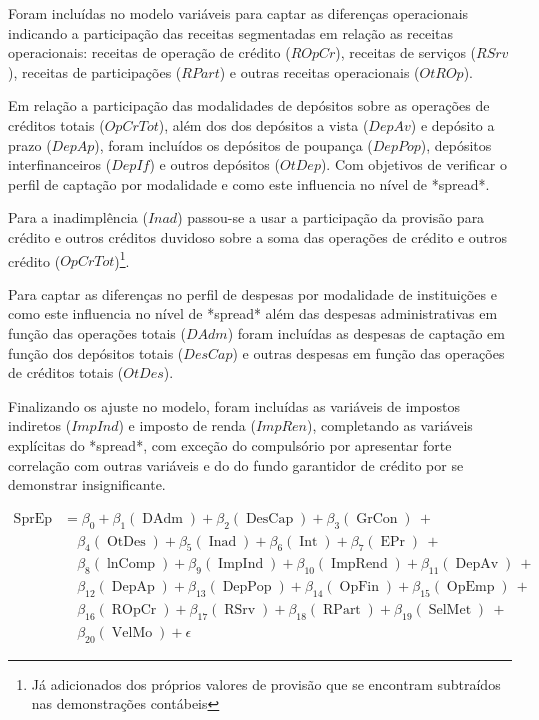 \documentclass[
  12pt,
  12pt,
  openright,
  oneside,
  a4paper,
  chapter=TITLE,
  section=TITLE,
  subsection=TITLE,
  subsubsection=TITLE,
  english,
  portugues,
  sumario=tradicional]{abntex2}
\begin{document}
\begin{apendicesenv}
Foram incluídas no modelo variáveis  para captar as diferenças operacionais indicando a participação das receitas segmentadas em relação as receitas operacionais: receitas de operação de crédito ($ROpCr$), receitas de serviços ($RSrv$), receitas de participações ($RPart$) e outras receitas operacionais ($OtROp$).

Em relação a participação das modalidades de depósitos sobre as operações de créditos totais ($OpCrTot$), além dos dos depósitos a vista ($DepAv$) e depósito a prazo ($DepAp$),  foram incluídos os depósitos de poupança ($DepPop$), depósitos interfinanceiros ($DepIf$) e outros depósitos ($OtDep$). Com objetivos de verificar o perfil de captação por modalidade e como este influencia no nível de *spread*. 

Para a inadimplência ($Inad$) passou-se a usar a participação da provisão para crédito e outros créditos duvidoso sobre a soma das operações de crédito e outros crédito ($OpCrTot$)\footnote{Já adicionados dos próprios valores de provisão que se encontram subtraídos nas demonstrações contábeis}. 

Para captar as diferenças no perfil de despesas por modalidade de instituições e como este influencia no nível de *spread* além das despesas administrativas em função das operações totais ($DAdm$) foram incluídas as despesas de captação em função dos depósitos totais ($DesCap$) e outras despesas em função das operações de créditos totais ($OtDes$).

Finalizando os ajuste no modelo, foram incluídas as variáveis de impostos indiretos ($ImpInd$) e imposto de renda ($ImpRen$), completando as variáveis explícitas do *spread*, com exceção do compulsório por apresentar forte correlação com outras variáveis e do do fundo garantidor de crédito por se demonstrar insignificante.



\begin{equation}
\begin{aligned}
\operatorname{SprEp} &= \beta_{0} + \beta_{1}(\operatorname{DAdm}) + \beta_{2}(\operatorname{DesCap}) + \beta_{3}(\operatorname{GrCon})\ + \\
&\quad \beta_{4}(\operatorname{OtDes}) + \beta_{5}(\operatorname{Inad}) + \beta_{6}(\operatorname{Int}) + \beta_{7}(\operatorname{EPr})\ + \\
&\quad \beta_{8}(\operatorname{lnComp}) + \beta_{9}(\operatorname{ImpInd}) + \beta_{10}(\operatorname{ImpRend}) + \beta_{11}(\operatorname{DepAv})\ + \\
&\quad \beta_{12}(\operatorname{DepAp}) + \beta_{13}(\operatorname{DepPop}) + \beta_{14}(\operatorname{OpFin}) + \beta_{15}(\operatorname{OpEmp})\ + \\
&\quad \beta_{16}(\operatorname{ROpCr}) + \beta_{17}(\operatorname{RSrv}) + \beta_{18}(\operatorname{RPart}) + \beta_{19}(\operatorname{SelMet})\ + \\
&\quad \beta_{20}(\operatorname{VelMo}) + \epsilon
\end{aligned}
\end{equation}








\end{apendicesenv}
\end{document}
